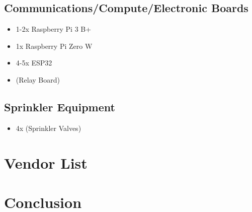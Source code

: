 \documentclass[letterpaper, 10 pt, conference]{ieeeconf}  %
\begin{document}
\subsection{Communications/Compute/Electronic Boards}
\begin{itemize}
  \item 1-2x Raspberry Pi 3 B+
  \item 1x Raspberry Pi Zero W
  \item 4-5x ESP32
  \item (Relay Board)
\end{itemize}

\subsection{Sprinkler Equipment}
\begin{itemize}
  \item 4x (Sprinkler Valves)
\end{itemize}

\section{Vendor List}

\section{Conclusion}

\begin{thebibliography}{99}
\end{thebibliography}
\end{document}
